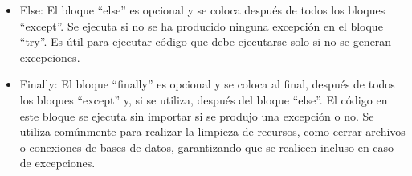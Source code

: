 \begin{itemize}
    
    \item Else: El bloque ``else'' es opcional y se coloca después de todos los bloques ``except''. Se ejecuta si no se ha producido ninguna excepción en el bloque ``try''. Es útil para ejecutar código que debe ejecutarse solo si no se generan excepciones.
    \begin{figure}[h]
        \centering
      \end{figure}
    
    \item Finally: El bloque ``finally'' es opcional y se coloca al final, después de todos los bloques ``except'' y, si se utiliza, después del bloque ``else''. El código en este bloque se ejecuta sin importar si se produjo una excepción o no. Se utiliza comúnmente para realizar la limpieza de recursos, como cerrar archivos o conexiones de bases de datos, garantizando que se realicen incluso en caso de excepciones.
    \begin{figure}[h]
        \centering
      \end{figure}

\end{itemize}

